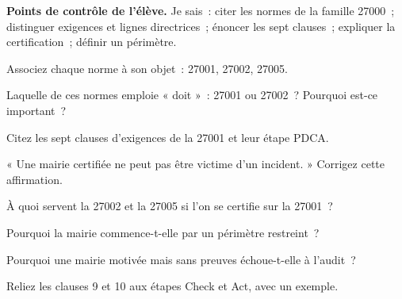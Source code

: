 \begin{boxinfo}
\textbf{Points de contrôle de l'élève.} Je sais~: citer les normes de la
famille 27000~; distinguer exigences et lignes directrices~; énoncer les sept
clauses~; expliquer la certification~; définir un périmètre.
\end{boxinfo}

\bigskip

\begin{boxexo}[title={\ding{45}\quad Exercice~7.1. La famille \niveaubase}]
Associez chaque norme à son objet~: 27001, 27002, 27005.
\end{boxexo}

\begin{boxexo}[title={\ding{45}\quad Exercice~7.2. Doit ou il convient \niveaubase}]
Laquelle de ces normes emploie « doit »~: 27001 ou 27002~? Pourquoi est-ce
important~?
\end{boxexo}

\begin{boxexo}[title={\ding{45}\quad Exercice~7.3. Les clauses \niveaubase}]
Citez les sept clauses d'exigences de la 27001 et leur étape PDCA.
\end{boxexo}

\begin{boxexo}[title={\ding{45}\quad Exercice~7.4. Ce que prouve la certification \niveaumoyen}]
« Une mairie certifiée ne peut pas être victime d'un incident. » Corrigez cette
affirmation.
\end{boxexo}

\begin{boxexo}[title={\ding{45}\quad Exercice~7.5. Rôle des lignes directrices \niveaumoyen}]
À quoi servent la 27002 et la 27005 si l'on se certifie sur la 27001~?
\end{boxexo}

\begin{boxexo}[title={\ding{45}\quad Exercice~7.6. Périmètre \niveaumoyen}]
Pourquoi la mairie commence-t-elle par un périmètre restreint~?
\end{boxexo}

\begin{boxexo}[title={\ding{45}\quad Exercice~7.7. Preuve \niveaumoyen}]
Pourquoi une mairie motivée mais sans preuves échoue-t-elle à l'audit~?
\end{boxexo}

\begin{boxexo}[title={\ding{45}\quad Exercice~7.8. PDCA et clauses \niveaumoyen}]
Reliez les clauses 9 et 10 aux étapes Check et Act, avec un exemple.
\end{boxexo}


